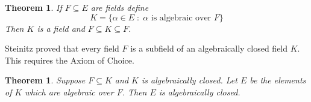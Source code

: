 \documentclass[12pt]{article}
\def\al{\alpha}
\def\al{\alpha}
\def\su{\subseteq}
\def\st{\;:\;}
\newtheorem{thm}[theorem]{Theorem}
\begin{document}
\begin{thm}
If $F\su E$ are fields define
$$K=\{\al\in E\st \al \mbox{ is algebraic over } F\}$$
Then $K$ is a field and $F\su K\su F$.
\end{thm}

Steinitz proved that every field $F$ is a subfield of an algebraically
closed field $K$.  This requires the Axiom of Choice.

\begin{thm}
Suppose $F\su K$ and $K$ is algebraically closed.  Let
$E$ be the elements of $K$ which are algebraic over $F$.  Then
$E$ is algebraically closed.
\end{thm}
\end{document}
